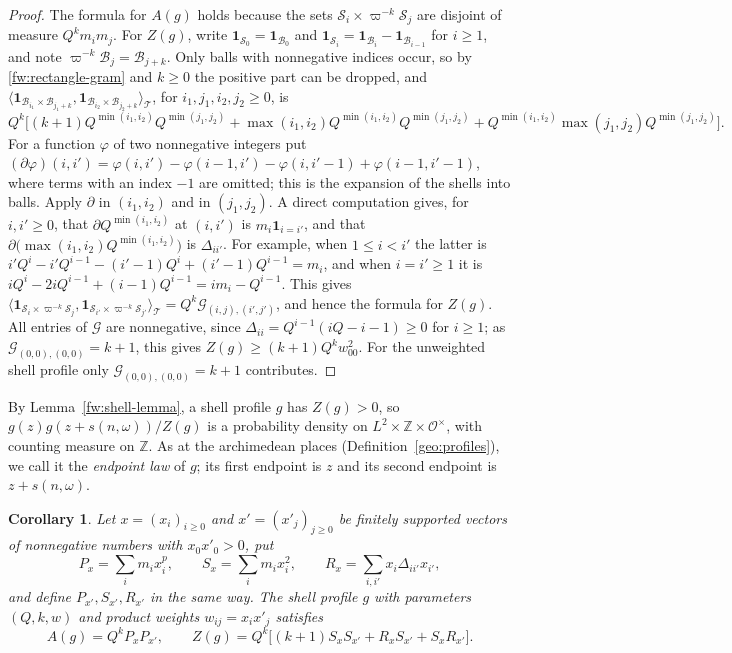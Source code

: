 \documentclass[11pt]{amsart}
\numberwithin{equation}{section}
\newtheorem{corollary}[equation]{Corollary}
\theoremstyle{definition}
\theoremstyle{remark}
\newcommand{\Z}{\mathbb Z}
\begin{document}
\begin{proof}
The formula for $A(g)$ holds because the sets
$\mathcal S_i\times\varpi^{-k}\mathcal S_j$ are disjoint of measure
$Q^km_im_j$. For $Z(g)$, write $\mathbf 1_{\mathcal S_0}=\mathbf
1_{\mathcal B_0}$ and $\mathbf 1_{\mathcal S_i}=\mathbf 1_{\mathcal
B_i}-\mathbf 1_{\mathcal B_{i-1}}$ for $i\ge1$, and note
$\varpi^{-k}\mathcal B_j=\mathcal B_{j+k}$. Only balls with nonnegative
indices occur, so by \eqref{fw:rectangle-gram} and $k\ge0$ the positive
part can be dropped, and
$\langle\mathbf 1_{\mathcal B_{i_1}\times\mathcal B_{j_1+k}},
\mathbf 1_{\mathcal B_{i_2}\times\mathcal B_{j_2+k}}\rangle_{\mathcal T}$,
for $i_1,j_1,i_2,j_2\ge0$, is
\[
 Q^k\bigl[(k+1)Q^{\min(i_1,i_2)}Q^{\min(j_1,j_2)}
 +\max(i_1,i_2)Q^{\min(i_1,i_2)}Q^{\min(j_1,j_2)}
 +Q^{\min(i_1,i_2)}\max(j_1,j_2)Q^{\min(j_1,j_2)}\bigr].
\]
For a function $\varphi$ of two nonnegative integers put
$(\partial\varphi)(i,i')=\varphi(i,i')-\varphi(i-1,i')-\varphi(i,i'-1)
+\varphi(i-1,i'-1)$, where terms with an index $-1$ are omitted; this is
the expansion of the shells into balls. Apply $\partial$ in
$(i_1,i_2)$ and in $(j_1,j_2)$. A direct computation gives, for
$i,i'\ge0$, that $\partial Q^{\min(i_1,i_2)}$ at $(i,i')$ is
$m_i\mathbf 1_{i=i'}$, and that
$\partial\bigl(\max(i_1,i_2)Q^{\min(i_1,i_2)}\bigr)$ is $\Delta_{ii'}$.
For example, when $1\le i<i'$ the latter is
$i'Q^i-i'Q^{i-1}-(i'-1)Q^i+(i'-1)Q^{i-1}=m_i$, and when $i=i'\ge1$ it is
$iQ^i-2iQ^{i-1}+(i-1)Q^{i-1}=im_i-Q^{i-1}$. This gives
$\langle\mathbf 1_{\mathcal S_i\times\varpi^{-k}\mathcal S_j},
\mathbf 1_{\mathcal S_{i'}\times\varpi^{-k}\mathcal S_{j'}}\rangle_{\mathcal T}
=Q^k\mathcal G_{(i,j),(i',j')}$, and hence the formula for $Z(g)$.
All entries of $\mathcal G$ are nonnegative, since
$\Delta_{ii}=Q^{i-1}(iQ-i-1)\ge0$ for $i\ge1$; as
$\mathcal G_{(0,0),(0,0)}=k+1$, this gives $Z(g)\ge(k+1)Q^kw_{00}^2$.
For the unweighted shell profile only $\mathcal G_{(0,0),(0,0)}=k+1$
contributes.
\end{proof}

By Lemma~\ref{fw:shell-lemma}, a shell profile $g$ has $Z(g)>0$, so
$g(z)g(z+s(n,\omega))/Z(g)$ is a probability density on
$L^2\times\Z\times\mathcal O^\times$, with counting measure on $\Z$. As
at the archimedean places (Definition~\ref{geo:profiles}), we call it
the \emph{endpoint law} of $g$; its first endpoint is $z$ and its second
endpoint is $z+s(n,\omega)$.

\begin{corollary}\label{fw:product-weights}
Let $x=(x_i)_{i\ge0}$ and $x'=(x'_j)_{j\ge0}$ be finitely supported
vectors of nonnegative numbers with $x_0x'_0>0$, put
\[
 P_x=\sum_im_ix_i^p,\qquad S_x=\sum_im_ix_i^2,\qquad
 R_x=\sum_{i,i'}x_i\Delta_{ii'}x_{i'},
\]
and define $P_{x'},S_{x'},R_{x'}$ in the same way. The shell profile
$g$ with parameters $(Q,k,w)$ and product weights $w_{ij}=x_ix'_j$
satisfies
\begin{equation}\label{fw:product-shells}
 A(g)=Q^kP_xP_{x'},\qquad
 Z(g)=Q^k\bigl[(k+1)S_xS_{x'}+R_xS_{x'}+S_xR_{x'}\bigr].
\end{equation}
\end{corollary}
\end{document}
